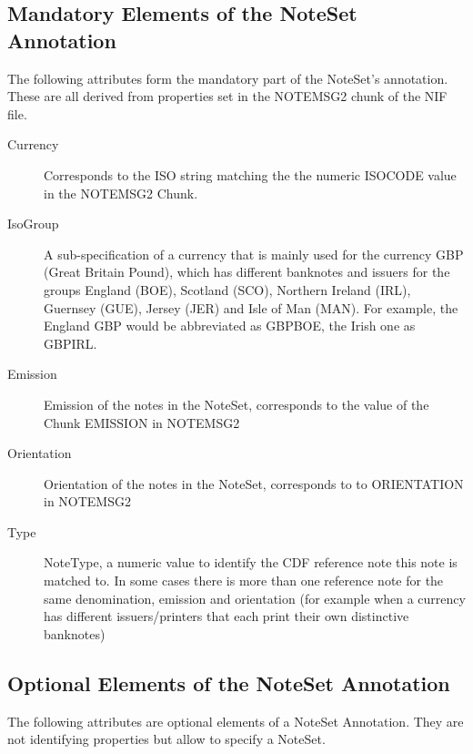\subsection{Mandatory Elements of the NoteSet Annotation}
The following attributes form the mandatory part of the NoteSet's annotation. These are all derived from properties set in the NOTEMSG2 chunk of the NIF file. 
\begin{description}
  \item[Currency] Corresponds to the ISO string matching the the numeric ISOCODE value in the NOTEMSG2 Chunk.
  \item[IsoGroup] A sub-specification of a currency that is mainly used for the currency GBP (Great Britain Pound), which has different banknotes and issuers for the groups England (BOE), Scotland (SCO), Northern Ireland (IRL), Guernsey (GUE), Jersey (JER) and Isle of Man (MAN). For example, the England GBP would be abbreviated as GBPBOE, the Irish one as GBPIRL.
  \item[Emission] Emission of the notes in the NoteSet, corresponds to the value of the Chunk EMISSION in NOTEMSG2
  \item[Orientation] Orientation of the notes in the NoteSet, corresponds to to ORIENTATION in NOTEMSG2
\item[Type] NoteType, a numeric value to identify the CDF reference note this note is matched to. In some cases there is more than one reference note for the same denomination, emission and orientation (for example when a currency has different issuers/printers that each print their own distinctive banknotes)
\end{description}

\subsection{Optional Elements of the NoteSet Annotation}
The following attributes are optional elements of a NoteSet Annotation. They are not identifying properties but allow to specify a NoteSet.

